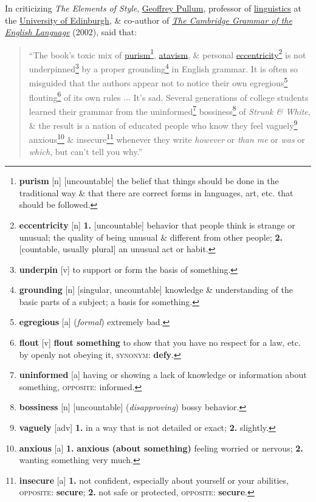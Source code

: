 \documentclass[oneside]{book}
\numberwithin{equation}{section}
\begin{document}
In criticizing \textit{The Elements of Style}, \href{https://en.wikipedia.org/wiki/Geoffrey_Pullum}{Geoffrey Pullum}, professor of \href{https://en.wikipedia.org/wiki/Linguistics}{linguistics} at the \href{https://en.wikipedia.org/wiki/University_of_Edinburgh}{University of Edinburgh}, \& co-author of \href{https://en.wikipedia.org/wiki/The_Cambridge_Grammar_of_the_English_Language}{\textit{The Cambridge Grammar of the English Language}} (2002), said that:
\begin{quotation}
	``The book's toxic mix of \href{https://en.wikipedia.org/wiki/Linguistic_purism}{purism}\footnote{\textbf{purism} [n] [uncountable] the belief that things should be done in the traditional way \& that there are correct forms in languages, art, etc. that should be followed.}, \href{https://en.wikipedia.org/wiki/Atavism}{atavism}, \& personal \href{https://en.wikipedia.org/wiki/Eccentricity_(behavior)}{eccentricity}\footnote{\textbf{eccentricity} [n] \textbf{1.} [uncountable] behavior that people think is strange or unusual; the quality of being unusual \& different from other people; \textbf{2.} [countable, usually plural] an unusual act or habit.} is not underpinned\footnote{\textbf{underpin} [v] to support or form the basis of something.} by a proper grounding\footnote{\textbf{grounding} [n] [singular, uncountable] knowledge \& understanding of the basic parts of a subject; a basis for something.} in English grammar. It is often so misguided that the authors appear not to notice their own egregious\footnote{\textbf{egregious} [a] (\textit{formal}) extremely bad.} flouting\footnote{\textbf{flout} [v] \textbf{flout something} to show that you have no respect for a law, etc. by openly not obeying it, \textsc{synonym}: \textbf{defy}.} of its own rules $\ldots$ It's sad. Several generations of college students learned their grammar from the uninformed\footnote{\textbf{uninformed} [a] having or showing a lack of knowledge or information about something, \textsc{opposite}: informed.} bossiness\footnote{\textbf{bossiness} [n] [uncountable] (\textit{disapproving}) bossy behavior.} of \textit{Strunk \& White}, \& the result is a nation of educated people who know they feel vaguely\footnote{\textbf{vaguely} [adv] \textbf{1.} in a way that is not detailed or exact; \textbf{2.} slightly.} anxious\footnote{\textbf{anxious} [a] \textbf{1.} \textbf{anxious (about something)} feeling worried or nervous; \textbf{2.} wanting something very much.} \& insecure\footnote{\textbf{insecure} [a] \textbf{1.} not confident, especially about yourself or your abilities, \textsc{opposite}: \textbf{secure}; \textbf{2.} not safe or protected, \textsc{opposite}: \textbf{secure}.} whenever they write \textit{however} or \textit{than me} or \textit{was} or \textit{which}, but can't tell you why.''
\end{quotation}
\end{document}
